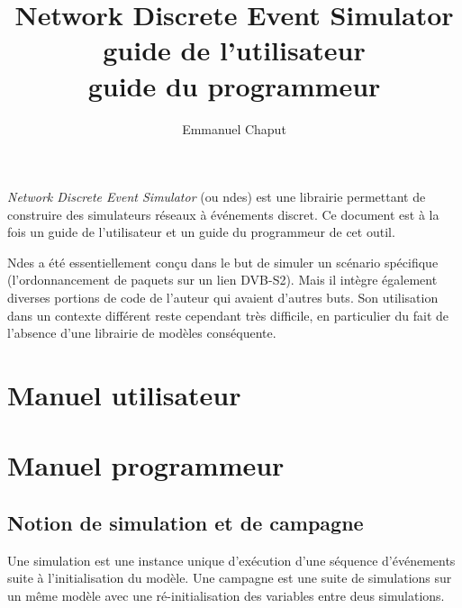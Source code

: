 \documentclass{book}
\title{Network Discrete Event Simulator\\
       guide de l'utilisateur\\
       guide du programmeur}
\author{Emmanuel Chaput}
\begin{document}
\maketitle

   {\em Network Discrete Event Simulator} (ou {\sc ndes}) est une
librairie permettant de construire des simulateurs réseaux à
événements discret. Ce document est à la fois un guide de
l'utilisateur et un guide du programmeur de cet outil.

   {\sc Ndes} a été essentiellement conçu dans le but de simuler un
scénario spécifique (l'ordonnancement de paquets sur un lien
DVB-S2). Mais il intègre également diverses portions de code de
l'auteur qui avaient d'autres buts. Son utilisation dans un contexte
différent reste cependant très difficile, en particulier du fait de
l'absence d'une librairie de modèles conséquente.

\newpage
\tableofcontents
\newpage

%
\chapter{Manuel utilisateur}





%
\chapter{Manuel programmeur}








%
\section{Notion de simulation et de campagne}

   Une simulation est une instance unique d'exécution d'une séquence
d'événements suite à l'initialisation du modèle. Une campagne est une
suite de simulations sur un même modèle avec une ré-initialisation des
variables entre deus simulations.
\end{document}
